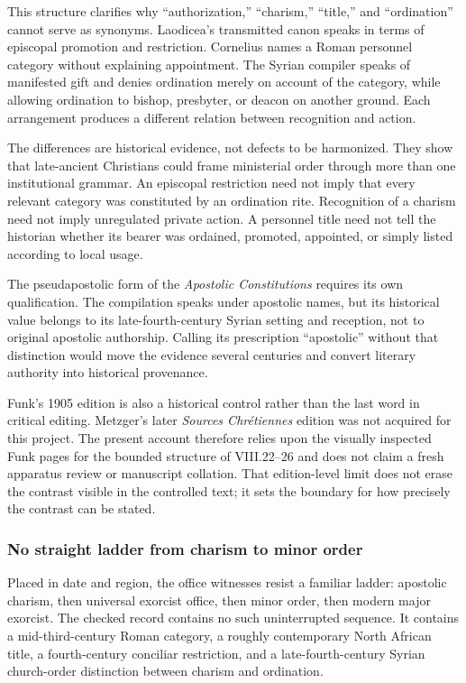 This structure clarifies why ``authorization,'' ``charism,'' ``title,'' and
``ordination'' cannot serve as synonyms. Laodicea's transmitted canon speaks
in terms of episcopal promotion and restriction. Cornelius names a Roman
personnel category without explaining appointment. The Syrian compiler speaks
of manifested gift and denies ordination merely on account of the category,
while allowing ordination to bishop, presbyter, or deacon on another ground.
Each arrangement produces a different relation between recognition and
action.

The differences are historical evidence, not defects to be harmonized. They
show that late-ancient Christians could frame ministerial order through more
than one institutional grammar. An episcopal restriction need not imply that
every relevant category was constituted by an ordination rite. Recognition of
a charism need not imply unregulated private action. A personnel title need
not tell the historian whether its bearer was ordained, promoted, appointed,
or simply listed according to local usage.

The pseudapostolic form of the \emph{Apostolic Constitutions} requires its own
qualification. The compilation speaks under apostolic names, but its
historical value belongs to its late-fourth-century Syrian setting and
reception, not to original apostolic authorship. Calling its prescription
``apostolic'' without that distinction would move the evidence several
centuries and convert literary authority into historical provenance.

Funk's 1905 edition is also a historical control rather than the last word in
critical editing. Metzger's later \emph{Sources Chrétiennes} edition was not
acquired for this project. The present account therefore relies upon the
visually inspected Funk pages for the bounded structure of VIII.22--26 and
does not claim a fresh apparatus review or manuscript collation. That
edition-level limit does not erase the contrast visible in the controlled
text; it sets the boundary for how precisely the contrast can be stated.

\subsubsection{No straight ladder from charism to minor order}

Placed in date and region, the office witnesses resist a familiar ladder:
apostolic charism, then universal exorcist office, then minor order, then
modern major exorcist. The checked record contains no such uninterrupted
sequence. It contains a mid-third-century Roman category, a roughly
contemporary North African title, a fourth-century conciliar restriction, and
a late-fourth-century Syrian church-order distinction between charism and
ordination.

